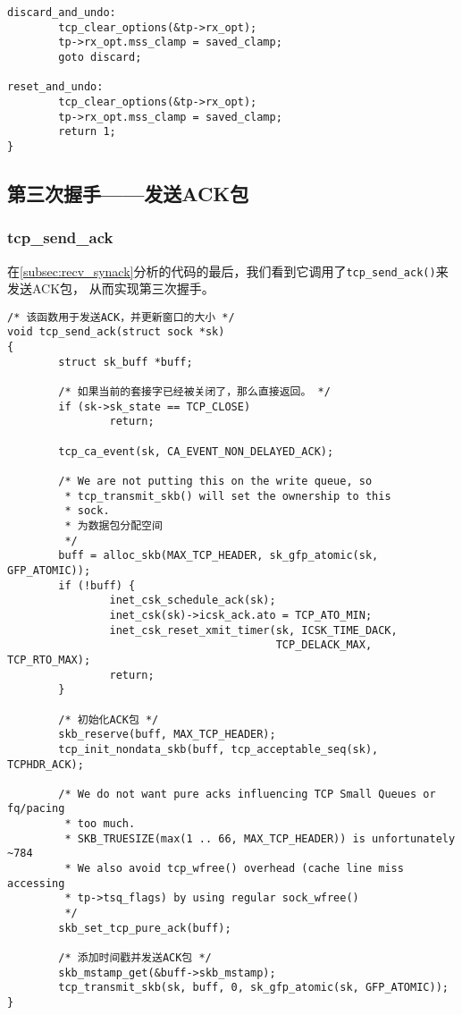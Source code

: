 \begin{verbatim}
discard_and_undo:
        tcp_clear_options(&tp->rx_opt);
        tp->rx_opt.mss_clamp = saved_clamp;
        goto discard;

reset_and_undo:
        tcp_clear_options(&tp->rx_opt);
        tp->rx_opt.mss_clamp = saved_clamp;
        return 1;
}
\end{verbatim}

\subsection{第三次握手——发送ACK包}
\label{subsec:send_ack}

\subsubsection{tcp\_send\_ack}
\label{subsubsec:tcp_send_ack}
在\ref{subsec:recv_synack}分析的代码的最后，我们看到它调用了\texttt{tcp_send_ack()}来发送ACK包，
从而实现第三次握手。

\begin{verbatim}
/* 该函数用于发送ACK，并更新窗口的大小 */
void tcp_send_ack(struct sock *sk)
{
        struct sk_buff *buff;

        /* 如果当前的套接字已经被关闭了，那么直接返回。 */
        if (sk->sk_state == TCP_CLOSE)
                return;

        tcp_ca_event(sk, CA_EVENT_NON_DELAYED_ACK);

        /* We are not putting this on the write queue, so
         * tcp_transmit_skb() will set the ownership to this
         * sock.
         * 为数据包分配空间
         */
        buff = alloc_skb(MAX_TCP_HEADER, sk_gfp_atomic(sk, GFP_ATOMIC));
        if (!buff) {
                inet_csk_schedule_ack(sk);
                inet_csk(sk)->icsk_ack.ato = TCP_ATO_MIN;
                inet_csk_reset_xmit_timer(sk, ICSK_TIME_DACK,
                                          TCP_DELACK_MAX, TCP_RTO_MAX);
                return;
        }

        /* 初始化ACK包 */
        skb_reserve(buff, MAX_TCP_HEADER);
        tcp_init_nondata_skb(buff, tcp_acceptable_seq(sk), TCPHDR_ACK);

        /* We do not want pure acks influencing TCP Small Queues or fq/pacing
         * too much.
         * SKB_TRUESIZE(max(1 .. 66, MAX_TCP_HEADER)) is unfortunately ~784
         * We also avoid tcp_wfree() overhead (cache line miss accessing
         * tp->tsq_flags) by using regular sock_wfree()
         */
        skb_set_tcp_pure_ack(buff);

        /* 添加时间戳并发送ACK包 */
        skb_mstamp_get(&buff->skb_mstamp);
        tcp_transmit_skb(sk, buff, 0, sk_gfp_atomic(sk, GFP_ATOMIC));
}
\end{verbatim}

